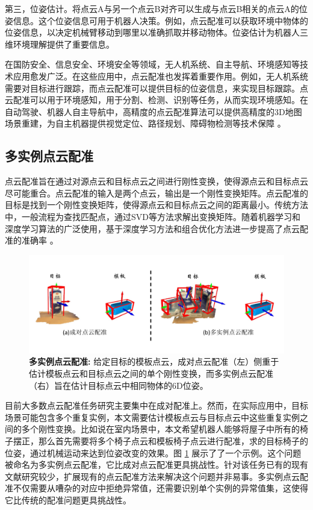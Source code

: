 第三，位姿估计。将点云A与另一个点云B对齐可以生成与点云B相关的点云A的位姿信息。这个位姿信息可用于机器人决策。例如，点云配准可以获取环境中物体的位姿信息，以决定机械臂移动到哪里以准确抓取并移动物体。位姿估计为机器人三维环境理解提供了重要信息。

在国防安全、信息安全、环境安全等领域，无人机系统、自主导航、环境感知等技术应用愈发广泛。在这些应用中，点云配准也发挥着重要作用。例如，无人机系统需要对目标进行跟踪，而点云配准可以提供目标的位姿信息，来实现目标跟踪。点云配准可以用于环境感知，用于分割、检测、识别等任务，从而实现环境感知。在自动驾驶、机器人自主导航中，高精度的点云配准算法可以提供高精度的3D地图场景重建，为自主机器提供视觉定位、路径规划、障碍物检测等技术保障\cite{zidongjiashilujingguihua} 。


\subsection{多实例点云配准}
点云配准旨在通过对源点云和目标点云之间进行刚性变换，使得源点云和目标点云尽可能重合。点云配准的输入是两个点云，输出是一个刚性变换矩阵。点云配准的目标是找到一个刚性变换矩阵，使得源点云和目标点云之间的距离最小。传统方法中，一般流程为查找匹配点，通过SVD\cite{SVD}等方法求解出变换矩阵。随着机器学习和深度学习算法的广泛使用，基于深度学习方法和组合优化方法进一步提高了点云配准的准确率\cite{deng2018ppf,deng2018ppfnet,qin2022geometric} 。

\begin{figure}[ht]
    \vspace{-4mm}
    \includegraphics[width=\textwidth]{images/teaser.pdf}
    \caption{\textbf{多实例点云配准: } 给定目标的模板点云，成对点云配准（左）侧重于估计模板点云和目标点云之间的单个刚性变换，而多实例点云配准（右）旨在估计目标点云中相同物体的6D位姿。
    }
    \label{fig:teaser}
    \vspace{-10mm}
\end{figure}

目前大多数点云配准任务研究主要集中在成对配准上。然而，在实际应用中，目标场景可能包含多个重复实例，本文需要估计模板点云与目标点云中这些重复实例之间的多个刚性变换。比如说在室内场景中，本文希望机器人能够将屋子中所有的椅子摆正，那么首先需要将多个椅子点云和模板椅子点云进行配准，求的目标椅子的位姿，通过机械运动来达到位姿改变的效果。图 \ref{fig:teaser} 展示了了一个示例。这个问题被命名为多实例点云配准，它比成对点云配准更具挑战性。针对该任务已有的现有文献研究较少，扩展现有的点云配准方法来解决这个问题并非易事。多实例点云配准不仅需要从嘈杂的对应中拒绝异常值，还需要识别单个实例的异常值集，这使得它比传统的配准问题更具挑战性。

